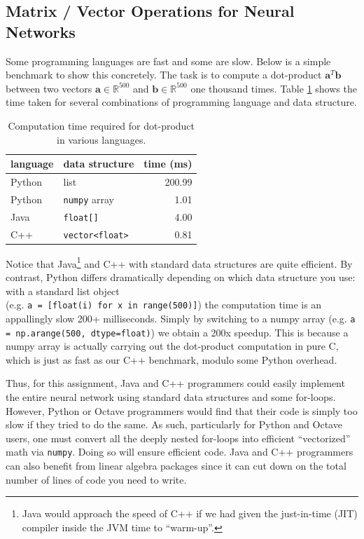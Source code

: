 \documentclass[11pt]{article}
\numberwithin{equation}{section} %
\numberwithin{figure}{section} %
\numberwithin{table}{section} %
\newcommand{\Rb}{\mathbb{R}}
\newcommand{\av}{\mathbf{a}}
\newcommand{\bv}{\mathbf{b}}
\begin{document}
\subsection{Matrix / Vector Operations for Neural Networks}
\label{sec:vectorize}

Some programming languages are fast and some are slow. Below is a simple benchmark to show this concretely. The task is to compute a dot-product $\av^T \bv$ between two vectors $\av \in \Rb^{500}$ and $\bv \in \Rb^{500}$ one thousand times. Table \ref{tab:dotprod} shows the time taken for several combinations of programming language and data structure. 

\begin{table}[H]
    \begin{center}
    \begin{tabular}{llr}
        \toprule
        {\bf language} & {\bf data structure} & {\bf time (ms)} \\
        \midrule
        Python & list & 200.99 \\
        Python & \texttt{numpy} array & 1.01\\
        Java & \texttt{float[]} & 4.00 \\
        C++ & \texttt{vector<float>} & 0.81\\
        \bottomrule
    \end{tabular}
    \end{center}
    \caption{Computation time required for dot-product in various languages.}
    \label{tab:dotprod}
\end{table}

Notice that Java\footnote{Java would approach the speed of C++ if we had given the just-in-time (JIT) compiler inside the JVM time to ``warm-up''.} and C++ with standard data structures are quite efficient. By contrast, Python differs dramatically depending on which data structure you use: with a standard list object \\(e.g. \lstinline{a = [float(i) for x in range(500)]}) the computation time is an appallingly slow 200+ milliseconds. Simply by switching to a numpy array (e.g. \lstinline{a = np.arange(500, dtype=float)}) we obtain a 200x speedup. This is because a numpy array is actually carrying out the dot-product computation in pure C, which is just as fast as our C++ benchmark, modulo some Python overhead.

Thus, for this assignment, Java and C++ programmers could easily implement the entire neural network using standard data structures and some for-loops. However, Python or Octave programmers would find that their code is simply too slow if they tried to do the same. As such, particularly for Python and Octave users, one must convert all the deeply nested for-loops into efficient ``vectorized'' math via \lstinline{numpy}. Doing so will ensure efficient code. Java and C++ programmers can also benefit from linear algebra packages since it can cut down on the total number of lines of code you need to write.
\end{document}
